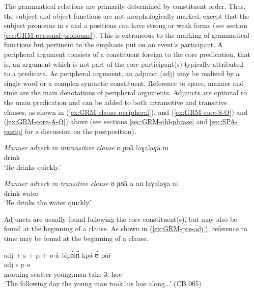 The grammatical relations are primarily determined by
constituent order. Thus, the subject and object functions are not
morphologically
marked,  except that the subject pronouns in {\sc s} and {\sc a} positions  can 
have  strong or  weak forms (see section \ref{sec:GRM-personal-pronouns}). This
is extraneous to the marking of grammatical functions but pertinent to the
emphasis put on  an  event's participant. A peripheral argument  consists of a
constituent foreign to the core predication, that is, an argument which is not
part of the core participant(s) typically attributed to a predicate.  As
peripheral argument,  an  adjunct  ({\sc adj}) may be realized by a single word
or a complex syntactic constituent. Reference to space, manner and time are the
main denotations of peripheral arguments.  Adjuncts are optional to the main
predication and can be added to both intransitive and transitive clauses, as
shown in  (\ref{ex:GRM-clause-peripheral}), and (\ref{ex:GRM-core-S-O}) and 
(\ref{ex:GRM-core-A-O}) above (see
sections \ref{sec:GRM-obl-phrase} and \ref{sec:SPA-postp} for a discussion on
the postposition).


\begin{exe}
\ex\label{ex:GRM-clause-peripheral}
\begin{xlist}

\ex\label{ex:vp26.12.}{\it Manner adverb in intransitive clause}
\gll ʊ ɲʊ̃ã  laɣalaɣa nɪ  \\
      {\psg} drink {\advm} {\postp}    \\
\glt  `He drinks quickly.' 

\ex\label{ex:vp26.13.}{\it  Manner adverb in transitive clause}
\gll ʊ ɲʊ̃ã a nɪɪ  laɣalaɣa nɪ \\
      {\psg} drink {\art} water  {\advm} {\postp}     \\
\glt  `He drinks the water quickly.' 


\end{xlist}
\end{exe}


Adjuncts are usually found following the core constituent(s), but may also be
found at the beginning of a clause. As
shown in (\ref{ex:GRM-pre-adj}), 
reference to time may be found at the beginning of a clause.


\begin{exe}
\ex\label{ex:GRM-pre-adj}{{\sc adj} $+$ {\sc s}  $+$ {\sc p}  $+$  {\sc o}  }
\glll  {[tʃʊ̀ɔ̀sá  pɪ̀sɪ̀]}   {à    bìpɔ̀lɪ́ɪ̀}  kpá {ʊ̀ páŕ}\\ 
 {\sc adj}  {\sc s}  {\sc p} {\sc o}\\
{morning   scatter}   {{\art} young.man} take {{3\sg.\poss} hoe}\\

 `The following day the young man took his hoe along...' (CB 005)
\end{exe}

